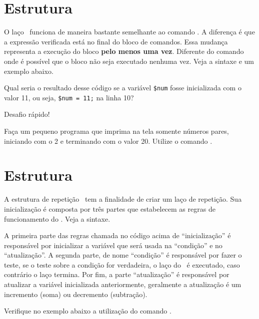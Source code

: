 \section{Estrutura \comandodowhile}
\label{estrutura-do-while}

O laço \comandodowhile~funciona de maneira bastante semelhante ao comando \comandowhile.
A diferença é que a expressão verificada está no final do bloco de comandos. Essa mudança
representa a execução do bloco \textbf{pelo menos uma vez}. Diferente do comando \comandowhile
onde é possível que o bloco não seja executado nenhuma vez. Veja a sintaxe e um exemplo
abaixo.



Qual seria o resultado desse código se a variável \texttt{\$num} fosse inicializada com o valor
11, ou seja, \texttt{\$num = 11;} na linha 10?

{\Large Desafio rápido!}

Faça um pequeno programa que imprima na tela somente números pares, iniciando com o 2
e terminando com o valor 20. Utilize o comando \comandodowhile. 

\section{Estrutura \comandofor}

A estrutura de repetição \comandofor~tem a finalidade de criar um laço de repetição.
Sua inicialização é composta por três partes que estabelecem as regras
de funcionamento do \comandofor. Veja a sintaxe.



A primeira parte das regras chamada no código acima de ``inicialização'' é responsável
por inicializar a variável que será usada na ``condição'' e no ``atualização''. A 
segunda parte, de nome ``condição'' é responsável por fazer o teste, se o teste sobre
a condição for verdadeira, o laço do \comandofor~é executado, caso contrário
o laço termina. Por fim, a parte ``atualização'' é responsável por atualizar a variável
inicializada anteriormente, geralmente a atualização é um incremento (soma) ou 
decremento (subtração).

Verifique no exemplo abaixo a utilização do comando \comandofor.



